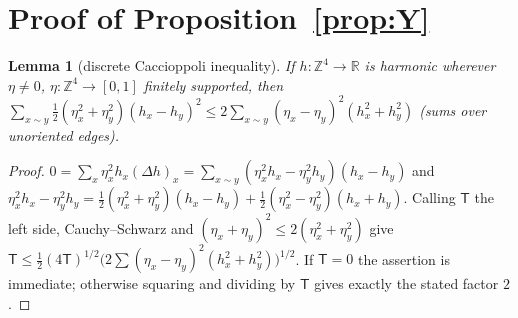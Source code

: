 \documentclass[11pt,a4paper]{article}
\theoremstyle{plain}
\newtheorem{lemma}[theorem]{Lemma}
\theoremstyle{definition}
\theoremstyle{remark}
\numberwithin{equation}{section}
\newcommand{\R}{\mathbb{R}}
\newcommand{\Z}{\mathbb{Z}}
\begin{document}
\section{Proof of Proposition~\ref{prop:Y}}\label{sec:Y}

\begin{lemma}[discrete Caccioppoli inequality]\label{lem:cacc}
If $h:\Z^4\to\R$ is harmonic wherever $\eta\ne0$, $\eta:\Z^4\to[0,1]$ finitely supported, then
$\sum_{x\sim y}\frac12(\eta_x^2+\eta_y^2)(h_x-h_y)^2\le2\sum_{x\sim y}(\eta_x-\eta_y)^2(h_x^2+h_y^2)$ (sums over unoriented edges).
\end{lemma}
\begin{proof}
$0=\sum_x\eta_x^2h_x(\Delta h)_x=\sum_{x\sim y}(\eta_x^2h_x-\eta_y^2h_y)(h_x-h_y)$ and
$\eta_x^2h_x-\eta_y^2h_y=\frac12(\eta_x^2+\eta_y^2)(h_x-h_y)+\frac12(\eta_x^2-\eta_y^2)(h_x+h_y)$. Calling $\mathsf T$ the left side,
Cauchy--Schwarz and $(\eta_x+\eta_y)^2\le2(\eta_x^2+\eta_y^2)$ give
$\mathsf T\le\frac12(4\mathsf T)^{1/2}\bigl(2\sum(\eta_x-\eta_y)^2(h_x^2+h_y^2)\bigr)^{1/2}$.
If $\mathsf T=0$ the assertion is immediate; otherwise squaring and dividing by $\mathsf T$ gives exactly the stated factor $2$.
\end{proof}
\end{document}
